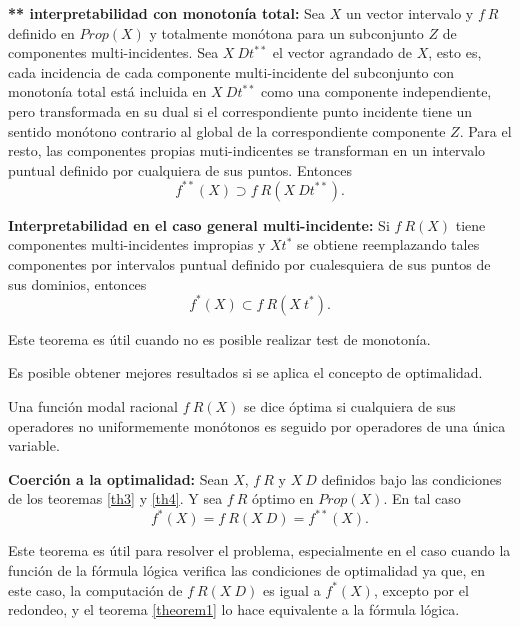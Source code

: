 \begin{theorem}{\textbf{** interpretabilidad con monotonía total:}}\label{th4}
Sea $X$ un vector intervalo y $f \ R$ definido en $Prop(X)$ y totalmente monótona para un subconjunto $Z$ de componentes multi-incidentes. Sea $X \ Dt^{**}$ el vector agrandado de $X$, esto es, cada incidencia de cada componente multi-incidente del subconjunto con monotonía total está incluida en $X \ Dt^{**}$ como una componente independiente, pero transformada en su dual si el correspondiente punto incidente tiene un sentido monótono contrario al global de la correspondiente componente $Z$. Para el resto, las componentes propias muti-indicentes se transforman en un intervalo puntual definido por cualquiera de sus puntos. Entonces
$$f^{**}(X) \supset f \ R(X \ Dt^{**}).$$
\end{theorem}

\begin{theorem}{\textbf{Interpretabilidad en el caso general multi-incidente:}}\label{th5}
Si $f \ R(X)$ tiene componentes multi-incidentes impropias y $Xt^*$ se obtiene reemplazando tales componentes por intervalos puntual definido por cualesquiera de sus puntos  de sus dominios, entonces
$$f^*(X) \subset f \ R(X \ t^*).$$
\end{theorem}

Este teorema es útil cuando no es posible realizar test de monotonía.

Es posible obtener mejores resultados si se aplica el concepto de optimalidad.

\begin{definition}
Una función modal racional $f \ R(X)$ se dice óptima si cualquiera de sus operadores no uniformemente monótonos es seguido por operadores de una única variable.
\end{definition}

\begin{theorem}{\textbf{Coerción a la optimalidad:}}\label{th6}
Sean $X$, $f \ R$ y $X \ D$ definidos bajo las condiciones de los teoremas \ref{th3} y \ref{th4}. Y sea $f \ R$ óptimo en $Prop(X)$. En tal caso
$$f^*(X) = f \ R(X \ D) = f^{**}(X).$$
\end{theorem}

Este teorema es útil para resolver el problema, especialmente en el caso cuando la función de la fórmula lógica verifica las condiciones de optimalidad ya que, en este caso, la computación de $f \ R(X \ D)$ es igual a $f^*(X)$, excepto por el redondeo, y el teorema \ref{theorem1} lo hace equivalente a la fórmula lógica.

